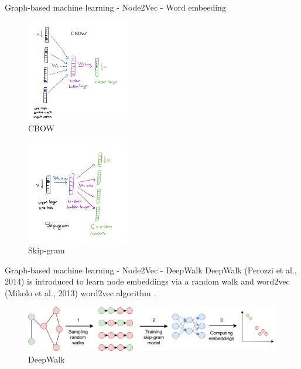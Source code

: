 \begin{frame}{Graph-based machine learning - Node2Vec - Word embeeding}
    \begin{multicols}{2}
        \begin{figure}[htp]
            \centering
            \includegraphics[width=0.4\textwidth]{topics/201010-zhang2019comprehensive/assets/img/cbow.png}
            \caption{CBOW}
        \end{figure}

        \begin{figure}[htp]
            \centering
            \includegraphics[width=0.4\textwidth]{topics/201010-zhang2019comprehensive/assets/img/skip-gram.png}
            \caption{Skip-gram}
        \end{figure}
    \end{multicols}
\end{frame}

\begin{frame}{Graph-based machine learning - Node2Vec - DeepWalk}
    DeepWalk (Perozzi et al., 2014) is introduced to learn node embeddings via a random walk and word2vec (Mikolo et al., 2013) word2vec algorithm \cite{perozzi2014deepwalk} \cite{mikolov2013distributed}.
    \begin{figure}[htp]
        \centering
        \includegraphics[width=\textwidth]{topics/201010-zhang2019comprehensive/assets/img/deepwalk.png}
        \caption{DeepWalk}
    \end{figure}
\end{frame}

